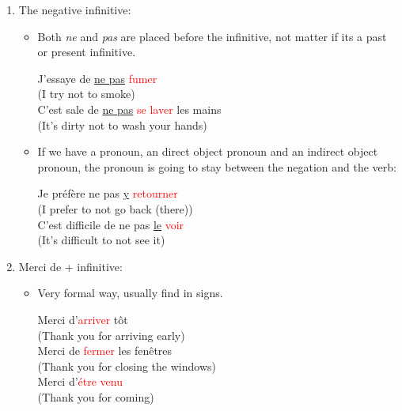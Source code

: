 \documentclass{book}
\begin{document}
\begin{enumerate}
\begin{itemize}
            \begin{center}
                Je ne me rappelle pas d'\textcolor{red}{avoir commandé} ça \\
                (I left after returning the keys) \\
                Est-ce que tu te souviens d'\textcolor{red}{avoir fermé} la porte? \\
                (Do you remember closing the door?)
            \end{center}
    \end{itemize}
    \item The negative infinitive: 
    \begin{itemize}
        \item Both \textit{ne} and \textit{pas} are placed before the infinitive, not matter if its a past or present infinitive.
        \begin{center}
            J'essaye de \underline{ne pas} \textcolor{red}{fumer} \\ 
            (I try not to smoke) \\
            C'est sale de \underline{ne pas} \textcolor{red}{se laver} les mains \\
            (It's dirty not to wash your hands)
        \end{center}
        \item If we have a pronoun, an direct object pronoun and an indirect object pronoun, the pronoun is going to stay between the negation and the verb:
        \begin{center}
            Je préfère ne pas \underline{y} \textcolor{red}{retourner} \\
            (I prefer to not go back (there)) \\
            C'est difficile de ne pas \underline{le} \textcolor{red}{voir} \\
            (It's difficult to not see it)
        \end{center}
    \end{itemize}
    \item Merci de + infinitive:
    \begin{itemize}
        \item Very formal way, usually find in signs.
        \begin{center}
            Merci d'\textcolor{red}{arriver} tôt \\
            (Thank you for arriving early) \\
            Merci de \textcolor{red}{fermer} les fenêtres \\
            (Thank you for closing the windows) \\
            Merci d'\textcolor{red}{étre venu} \\
            (Thank you for coming) 
        \end{center}
    \end{itemize}
\end{enumerate}
\end{document}
